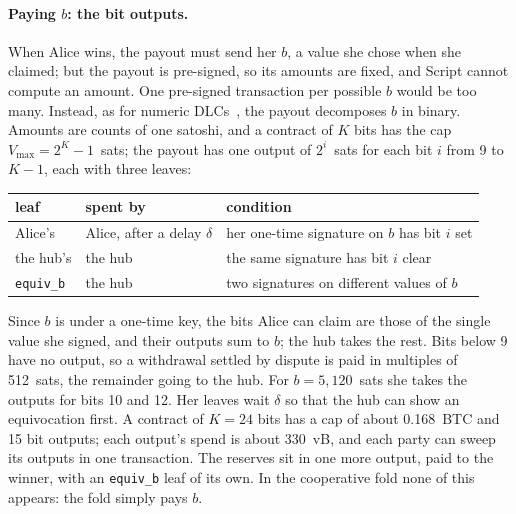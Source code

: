 \documentclass[11pt]{article}
\newcommand{\vmax}{V_{\max}}
\newcommand{\tx}[1]{\texttt{#1}}
\begin{document}
\paragraph{Paying $b$: the bit outputs.} When Alice wins, the payout
must send her $b$, a value she chose when she claimed; but the
payout is pre-signed, so its amounts are fixed, and Script cannot
compute an amount. One pre-signed transaction per possible $b$ would be
too many. Instead, as for numeric DLCs~\cite{dlcnumeric}, the payout decomposes
$b$ in binary. Amounts are counts of one satoshi, and a contract of $K$
bits has the cap $\vmax = 2^K - 1$~sats; the payout has one output of
$2^i$~sats for each bit $i$ from 9 to $K - 1$, each with three leaves:
\begin{center}
\small
\begin{tabular}{lll}
\toprule
leaf & spent by & condition \\
\midrule
Alice's & Alice, after a delay $\delta$ & her one-time signature on $b$ has bit $i$ set \\
the hub's & the hub & the same signature has bit $i$ clear \\
\tx{equiv\_b} & the hub & two signatures on different values of $b$ \\
\bottomrule
\end{tabular}
\end{center}
Since $b$ is under a one-time key, the bits Alice can claim are those of
the single value she signed, and their outputs sum to $b$; the hub takes
the rest. Bits below 9 have no output, so a withdrawal settled by
dispute is paid in multiples of 512~sats, the remainder going to the
hub. For $b = 5{,}120$~sats she takes the outputs for bits 10 and 12.
Her leaves wait $\delta$ so that the hub can show an equivocation first.
A contract of $K = 24$ bits has a cap of about 0.168~BTC and 15 bit
outputs; each output's spend is about 330~vB, and each party can sweep
its outputs in one transaction. The reserves sit in one more output,
paid to the winner, with an \tx{equiv\_b} leaf of its own. In the
cooperative fold none of this appears: the fold simply pays $b$.
\end{document}
